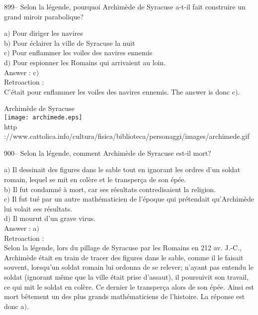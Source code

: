 ﻿\documentclass[letterpaper, 12pt]{article}
\begin{document}
899-- Selon la l\'egende, pourquoi Archim\`ede de Syracuse a-t-il
fait construire un grand miroir parabolique?

a$)$ Pour diriger les navires \\
b$)$ Pour \'eclairer la ville de Syracuse la nuit \\
c$)$ Pour enflammer les voiles des navires ennemis \\
d$)$ Pour espionner les Romains qui arrivaient au loin.\\

Answer : c$)$\\

Retroaction : \\
C'\'etait pour enflammer les voiles des navires ennemis. The answer is
donc c$)$.\\

        \begin{center}
        Archim\`ede de Syracuse\\
    \texttt{[image: archimede.eps]}\\
        {\footnotesize http
://www.cattolica.info/cultura/fisica/biblioteca/personaggi/images/archimede.gif}
    \end{center}

900-- Selon la l\'egende, comment Archim\`ede de Syracuse est-il
mort?

a$)$ Il dessinait des figures dans le sable tout en ignorant les ordres d'un
soldat romain, lequel se mit en col\`ere
et le transper\c ca de son \'ep\'ee. \\
b$)$ Il fut condamn\'e \`a mort, car ses r\'esultats contredisaient la
religion. \\
c$)$ Il fut tu\'e par un autre math\'ematicien de l'\'epoque qui
pr\'etendait qu'Archim\`ede lui volait ses r\'esultats. \\
d$)$ Il mourut d'un grave virus.\\

Answer : a$)$\\

Retroaction :\\
Selon la l\'egende, lors du pillage de Syracuse par les Romains en
212 av. J.-C., Archim\`ede \'etait en train de tracer des figures
dans le sable, comme il le faisait souvent, lorsqu'un soldat romain
lui ordonna de se relever; n'ayant pas entendu le soldat (ignorant
m\^eme que la ville \'etait prise d'assaut), il poursuivit son
travail, ce qui mit le soldat en col\`ere. Ce dernier le transper\c
ca alors de son \'ep\'ee. Ainsi est mort
b\^etement un des plus grands math\'ematiciens de l'histoire. La r\'eponse
est donc a$)$.\\
\end{document}
